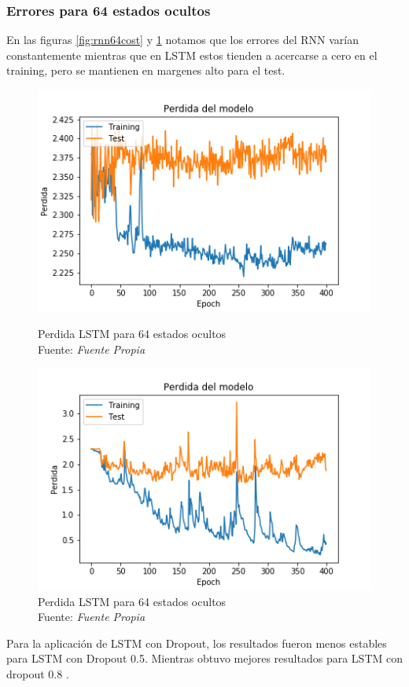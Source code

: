 \subsubsection{Errores para 64 estados ocultos}
En las figuras \ref{fig:rnn64cost} y \ref{fig:lstm1364cost} notamos que los errores del RNN varían constantemente mientras que en LSTM estos tienden a acercarse a cero en el training, pero se mantienen en margenes alto para el test.
\begin{figure}[H]
	\centering
	\includegraphics[width=0.7\linewidth]{Figures/rnn_64_cost}
	\caption{Perdida LSTM para 64 estados ocultos\\ Fuente: {\textit{Fuente Propia}}}
	\label{fig:rnn64cost}
	
	\centering
	\includegraphics[width=0.7\linewidth]{Figures/lstm13_64_cost}
	\caption{Perdida LSTM  para 64 estados ocultos \\ Fuente: {\textit{Fuente Propia}}}
	\label{fig:lstm1364cost}
\end{figure}
\newpage
Para la aplicación de LSTM con Dropout, los resultados fueron menos estables para LSTM con Dropout 0.5. Mientras obtuvo mejores resultados para LSTM con dropout 0.8 .
